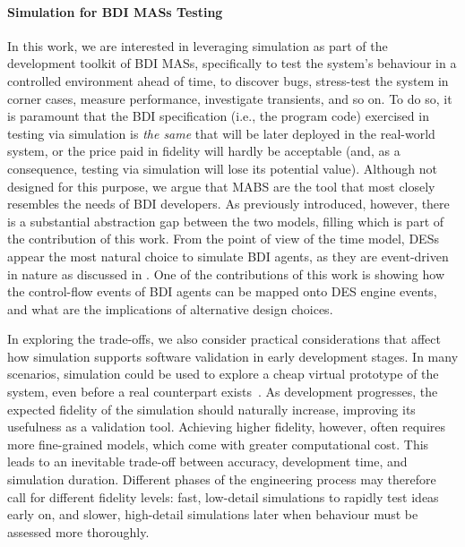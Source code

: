 \paragraph{Simulation for \ac{BDI} \acp{MAS} Testing}
In this work,
we are interested in leveraging simulation as part of the development toolkit of \ac{BDI} \acp{MAS},
specifically to test the system's behaviour in a controlled environment ahead of time,
to discover bugs,
stress-test the system in corner cases,
measure performance,
investigate transients,
and so on.
%
To do so,
it is paramount that the \ac{BDI} specification (i.e., the program code) exercised in testing via simulation
is \emph{the same} that will be later deployed in the real-world system,
or the price paid in fidelity will hardly be acceptable
(and, as a consequence, testing via simulation will lose its potential value).
%
Although not designed for this purpose,
we argue that \ac{MABS} are the tool that most closely resembles the needs of \ac{BDI} developers.
%
As previously introduced, however,
there is a substantial abstraction gap between the two models,
filling which is part of the contribution of this work.
%
From the point of view of the time model,
\acp{DES} appear the most natural choice to simulate \ac{BDI} agents,
as they are event-driven in nature as discussed in .
%
One of the contributions
of this work is showing how the control-flow events of \ac{BDI} agents can be mapped
onto \ac{DES} engine events,
and what are the implications of alternative design choices.

In exploring the trade-offs, we also consider practical considerations
that affect how simulation supports software validation in early development stages.
%
In many scenarios,
simulation could be used to explore a cheap virtual prototype of the system,
even before a real counterpart exists~\cite{DBLP:journals/jos/FortinoN13,DBLP:journals/csse/FortinoGR05}.
As development progresses, the expected fidelity of the simulation should naturally increase, improving its usefulness as a validation tool.
%
Achieving higher fidelity, however, often requires more fine-grained models,
which come with greater computational cost.
This leads to an inevitable trade-off between accuracy, development time, and simulation duration.
%
Different phases of the engineering process may therefore call for different fidelity levels: fast, low-detail simulations to rapidly test ideas early on, and slower, high-detail simulations later when behaviour must be assessed more thoroughly.

